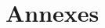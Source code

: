 \newpage

\begin{multicols}{2}
\rmfamily
\footnotesize

\end{multicols}

\newpage
{}
\setcounter{page}{1}

\setcounter{section}{0}
\section{Annexes}
\setcounter{subsection}{1}
